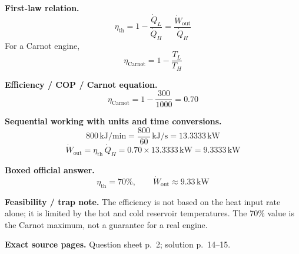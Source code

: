 \textbf{First-law relation.}
\[
\eta_{\text{th}} = 1-\frac{\dot Q_L}{\dot Q_H} = \frac{\dot W_{\text{out}}}{\dot Q_H}
\]
For a Carnot engine,
\[
\eta_{\text{Carnot}} = 1-\frac{T_L}{T_H}
\]

\textbf{Efficiency / COP / Carnot equation.}
\[
\eta_{\text{Carnot}} = 1-\frac{300}{1000} = 0.70
\]

\textbf{Sequential working with units and time conversions.}
\[
800\,\text{kJ/min} = \frac{800}{60}\,\text{kJ/s} = 13.3333\,\text{kW}
\]
\[
\dot W_{\text{out}} = \eta_{\text{th}}\,\dot Q_H = 0.70\times 13.3333\,\text{kW} = 9.3333\,\text{kW}
\]

\textbf{Boxed official answer.}
\[
\boxed{\eta_{\text{th}}=70\%, \qquad \dot W_{\text{out}}\approx 9.33\,\text{kW}}
\]

\textbf{Feasibility / trap note.} The efficiency is not based on the heat input rate alone; it is limited by the hot and cold reservoir temperatures. The 70\% value is the Carnot maximum, not a guarantee for a real engine.

\textbf{Exact source pages.} Question sheet p.~2; solution p.~14--15.
